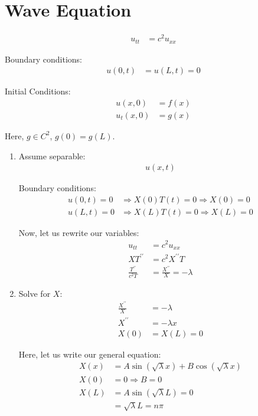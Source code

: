 \newpage
\section{Wave Equation}
%
\begin{align}
  u_{tt} & = c^2 u_{xx}
\end{align}

Boundary conditions:
%
\begin{align}
  u(0, t) & = u(L, t) = 0
\end{align}

Initial Conditions:
%
\begin{align}
  u(x, 0) & = f(x)\\
  u_t(x, 0) & = g(x)
\end{align}

Here, $g \in C^2$, $g(0) = g(L)$.
%
\begin{enumerate}
  \item Assume separable:
  \begin{align}
    u(x, t)
  \end{align}

  Boundary conditions:
  \begin{align}
    u(0, t) = 0 & \Rightarrow X(0)T(t) = 0 \Rightarrow X(0) = 0\\
    u(L, t) = 0 & \Rightarrow X(L)T(t) = 0 \Rightarrow X(L) = 0
  \end{align}

  Now, let us rewrite our variables:
  \begin{align}
    u_{tt} & = c^2u_{xx}\\
    XT^{\prime\prime} & = c^2 X^{\prime\prime}T\\
    \frac{T^{\prime\prime}}{c^2 T} & = \frac{X^{\prime\prime}}{X} = -\lambda
  \end{align}

  \item Solve for $X$:
  \begin{align}
    \frac{X^{\prime\prime}}{X} & = -\lambda\\
    X^{\prime\prime} & = -\lambda x\\
    X(0) & = X(L) = 0
  \end{align}

  Here, let us write our general equation:
  \begin{align}
    X(x) & = A\sin(\sqrt \lambda x) + B \cos (\sqrt \lambda x)\\
    X(0) & = 0 \Rightarrow B = 0\\
    X(L) & = A \sin(\sqrt \lambda L) = 0\\
    & = \sqrt \lambda L = n \pi
  \end{align}


\end{enumerate}
